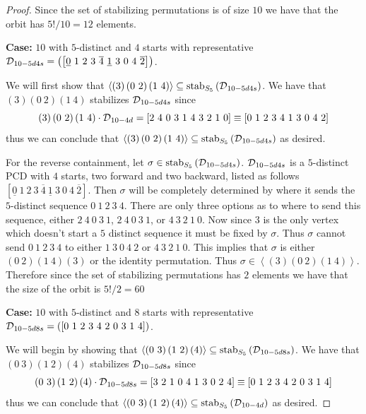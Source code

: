 \begin{proof}
\noindent
Since the set of stabilizing permutations is of size $10$ we have that the orbit has $5!/10 = 12$ elements.

\vspace{2ex}
\noindent
{\bf Case:} $10$ with $5$-distinct and $4$ starts with representative $\pcd_{10-5d4s} = \left(\left[\underline{0}\ 1\ 2\ 3\ \overline{4}\ \underline{1}\ 3\ 0\ 4\ \overline{2} \right] \right)$.
\vspace{2ex}

\noindent
We will first show that $\left<\left(3\right)\left(0\ 2\right)\left(1\ 4\right)\right> \subseteq \stab{S_5}{\pcd_{10-5d4s}}$. We have that $\left(3\right)\left(0\ 2\right)\left(1\ 4\right)$ stabilizes $\operatorname{\mathcal{D}}_{10-5d4s}$ since
\[
\acts{\left(3\right)\left(0\ 2\right)\left(1\ 4\right)}{\pcd_{10-4d}} = \left[2\ 4\ 0\ 3\ 1\ 4\ 3\ 2\ 1\ 0\right] \equiv \left[0\ 1\ 2\ 3\ 4\ 1\ 3\ 0\ 4\ 2 \right]
\]  thus we can conclude that $\left<\left(3\right)\left(0\ 2\right)\left(1\ 4\right)\right> \subseteq \stab{S_5}{\pcd_{10-5d4s}}$ as desired. 

For the reverse containment, let $\sigma \in \operatorname{\mathrm{stab}}_{S_5}\left(\operatorname{\mathcal{D}}_{10-5d4s} \right)$. $\operatorname{\mathcal{D}}_{10-5d4s}$ is a $5$-distinct PCD with $4$ starts, two forward and two backward, listed as follows $[\underline{0}\ 1\ 2\ 3\ \overline{4}\ \underline{1}\ 3\ 0 \ 4\ \overline{2}]$. Then $\sigma$ will be completely determined by where it sends the $5$-distinct sequence $0\ 1\ 2\ 3\ 4$. There are only three options as to where to send this sequence, either $2\ 4\ 0\ 3\ 1$, $2\ 4\ 0 \ 3\ 1$, or $4\ 3\ 2\ 1\ 0$. Now since $3$ is the only vertex which doesn't start a $5$ distinct sequence it must be fixed by $\sigma$. Thus $\sigma$ cannot send $0\ 1\ 2\ 3\ 4$ to either $1\ 3\ 0\ 4\ 2$ or $4\ 3\ 2\ 1\ 0$.  This implies that $\sigma$ is either $(0\ 2)(1\ 4)(3)$  or the identity permutation. Thus $\sigma \in \left<\left(3\right)\left(0\ 2\right)\left(1\ 4\right)\right>$.  Therefore since the set of stabilizing permutations has $2$ elements we have that the size of the orbit is $5!/2 = 60$

\vspace{2ex}
\noindent
{\bf Case:} $10$ with $5$-distinct and $8$ starts with representative $\pcd_{10-5d8s}=\left( \left[0\ 1\ 2\ 3\ 4\ 2\ 0\ 3\ 1\ 4\right]\right)$.
\vspace{2ex}

\noindent
We will begin by showing that $\left< \left(0\ 3\right)\left(1\ 2\right)\left(4\right)\right> \subseteq \operatorname{\mathrm{stab}}_{S_5}\left(\operatorname{\mathcal{D}}_{10-5d8s} \right)$. We have that $\left(0\ 3\right)\left(1\ 2\right)\left(4\right)$ stabilizes $\operatorname{\mathcal{D}}_{10-5d8s}$ since
\[
\acts{\left(0\ 3\right)\left(1\ 2\right)\left(4\right)}{\pcd_{10-5d8s}} = \left[3\ 2\ 1\ 0\ 4\ 1\ 3\ 0\ 2\ 4\right] \equiv \left[0\ 1\ 2\ 3\ 4\ 2\ 0\ 3\ 1\ 4\right]
\]  thus we can conclude that $\left<\left(0\ 3\right)\left(1\ 2\right)\left(4\right)\right> \subseteq \stab{S_5}{\pcd_{10-4d}}$ as desired.


\end{proof}
